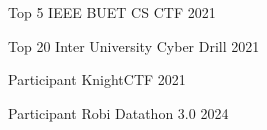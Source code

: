 

\begin{cvhonors}

  \cvhonor
    {Top 5} %
    {IEEE BUET CS CTF} %
    {} %
    {2021} %

  \cvhonor
    {Top 20} %
    {Inter University Cyber Drill} %
    {} %
    {2021} %

  \cvhonor
    {Participant} %
    {KnightCTF} %
    {} %
    {2021} %

  \cvhonor
    {Participant} %
    {Robi Datathon 3.0} %
    {} %
    {2024} %


\end{cvhonors}
